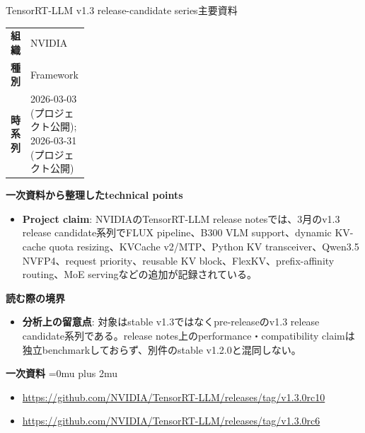\begin{technicalnote}{TensorRT-LLM v1.3 release-candidate series}{主要資料}
\begingroup
\begin{tabularx}{\linewidth}{@{}>{\bfseries}p{0.22\linewidth}X@{}}
組織 & NVIDIA \\
種別 & Framework \\
時系列 & 2026-03-03 (プロジェクト公開); 2026-03-31 (プロジェクト公開) \\
\end{tabularx}
\smallskip
{\bfseries 一次資料から整理したtechnical points}
\begin{itemize}[leftmargin=1.5em,itemsep=0.35em]
\item \textbf{Project claim}: NVIDIAのTensorRT-LLM release notesでは、3月のv1.3 release candidate系列でFLUX pipeline、B300 VLM support、dynamic KV-cache quota resizing、KVCache v2/MTP、Python KV transceiver、Qwen3.5 NVFP4、request priority、reusable KV block、FlexKV、prefix-affinity routing、MoE servingなどの追加が記録されている。
\end{itemize}
\begin{minipage}{\linewidth}
{\bfseries 読む際の境界}
\begin{itemize}[leftmargin=1.5em,itemsep=0.35em]
\item \textbf{分析上の留意点}: 対象はstable v1.3ではなくpre-releaseのv1.3 release candidate系列である。release notes上のperformance・compatibility claimは独立benchmarkしておらず、別件のstable v1.2.0と混同しない。
\end{itemize}
\begin{samepage}
{\bfseries 一次資料}
\begingroup\sloppy
\Urlmuskip=0mu plus 2mu\relax
\begin{itemize}[leftmargin=1.5em,itemsep=0.25em]
\item {\scriptsize\url{https://github.com/NVIDIA/TensorRT-LLM/releases/tag/v1.3.0rc10}}
\item {\scriptsize\url{https://github.com/NVIDIA/TensorRT-LLM/releases/tag/v1.3.0rc6}}
\end{itemize}
\endgroup
\end{samepage}
\end{minipage}
\endgroup
\end{technicalnote}
\medskip

